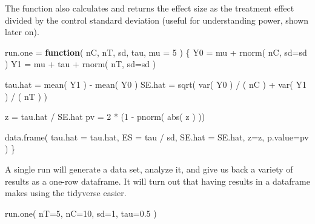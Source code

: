 \documentclass[
]{book}
\newenvironment{Shaded}{\begin{snugshade}}{\end{snugshade}}
\newcommand{\AttributeTok}[1]{\textcolor[rgb]{0.77,0.63,0.00}{#1}}
\newcommand{\ControlFlowTok}[1]{\textcolor[rgb]{0.13,0.29,0.53}{\textbf{#1}}}
\newcommand{\DecValTok}[1]{\textcolor[rgb]{0.00,0.00,0.81}{#1}}
\newcommand{\FloatTok}[1]{\textcolor[rgb]{0.00,0.00,0.81}{#1}}
\newcommand{\FunctionTok}[1]{\textcolor[rgb]{0.00,0.00,0.00}{#1}}
\newcommand{\NormalTok}[1]{#1}
\newcommand{\OtherTok}[1]{\textcolor[rgb]{0.56,0.35,0.01}{#1}}
\newcommand{\SpecialCharTok}[1]{\textcolor[rgb]{0.00,0.00,0.00}{#1}}
\begin{document}
The function also calculates and returns the effect size as the treatment
effect divided by the control standard deviation (useful for understanding
power, shown later on).

\begin{Shaded}
\begin{Highlighting}[]
\NormalTok{run.one }\OtherTok{=} \ControlFlowTok{function}\NormalTok{( nC, nT, sd, tau, }\AttributeTok{mu =} \DecValTok{5}\NormalTok{ ) \{}
\NormalTok{  Y0 }\OtherTok{=}\NormalTok{ mu }\SpecialCharTok{+} \FunctionTok{rnorm}\NormalTok{( nC, }\AttributeTok{sd=}\NormalTok{sd )}
\NormalTok{  Y1 }\OtherTok{=}\NormalTok{ mu }\SpecialCharTok{+}\NormalTok{ tau }\SpecialCharTok{+} \FunctionTok{rnorm}\NormalTok{( nT, }\AttributeTok{sd=}\NormalTok{sd )}

\NormalTok{  tau.hat }\OtherTok{=} \FunctionTok{mean}\NormalTok{( Y1 ) }\SpecialCharTok{{-}} \FunctionTok{mean}\NormalTok{( Y0 )}
\NormalTok{  SE.hat }\OtherTok{=} \FunctionTok{sqrt}\NormalTok{( }\FunctionTok{var}\NormalTok{( Y0 ) }\SpecialCharTok{/}\NormalTok{ ( nC ) }\SpecialCharTok{+} \FunctionTok{var}\NormalTok{( Y1 ) }\SpecialCharTok{/}\NormalTok{ ( nT ) )}

\NormalTok{  z }\OtherTok{=}\NormalTok{ tau.hat }\SpecialCharTok{/}\NormalTok{ SE.hat}
\NormalTok{  pv }\OtherTok{=} \DecValTok{2} \SpecialCharTok{*}\NormalTok{ (}\DecValTok{1} \SpecialCharTok{{-}} \FunctionTok{pnorm}\NormalTok{( }\FunctionTok{abs}\NormalTok{( z ) ))}

  \FunctionTok{data.frame}\NormalTok{( }\AttributeTok{tau.hat =}\NormalTok{ tau.hat, }\AttributeTok{ES =}\NormalTok{ tau }\SpecialCharTok{/}\NormalTok{ sd, }\AttributeTok{SE.hat =}\NormalTok{ SE.hat, }\AttributeTok{z=}\NormalTok{z, }\AttributeTok{p.value=}\NormalTok{pv )}
\NormalTok{\}}
\end{Highlighting}
\end{Shaded}

A single run will generate a data set, analyze it, and give us back a variety
of results as a one-row dataframe. It will turn out that having results in a
dataframe makes using the tidyverse easier.

\begin{Shaded}
\begin{Highlighting}[]
\FunctionTok{run.one}\NormalTok{( }\AttributeTok{nT=}\DecValTok{5}\NormalTok{, }\AttributeTok{nC=}\DecValTok{10}\NormalTok{, }\AttributeTok{sd=}\DecValTok{1}\NormalTok{, }\AttributeTok{tau=}\FloatTok{0.5}\NormalTok{ )}
\end{Highlighting}
\end{Shaded}
\end{document}
